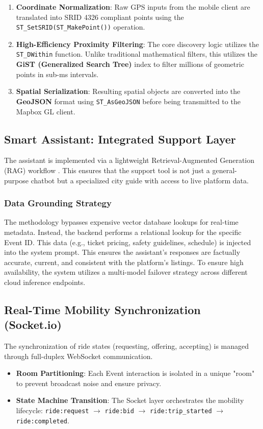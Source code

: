 \begin{enumerate}
    \item \textbf{Coordinate Normalization}: Raw GPS inputs from the mobile client are translated into SRID 4326 compliant points using the \texttt{ST\_SetSRID(ST\_MakePoint())} operation.
    \item \textbf{High-Efficiency Proximity Filtering}: The core discovery logic utilizes the \texttt{ST\_DWithin} function. Unlike traditional mathematical filters, this utilizes the \textbf{GiST (Generalized Search Tree)} index to filter millions of geometric points in sub-ms intervals.
    \item \textbf{Spatial Serialization}: Resulting spatial objects are converted into the \textbf{GeoJSON} format using \texttt{ST\_AsGeoJSON} before being transmitted to the Mapbox GL client.
\end{enumerate}

\subsection{Smart Assistant: Integrated Support Layer}
The assistant is implemented via a lightweight Retrieval-Augmented Generation (RAG) workflow \cite{llama3}. This ensures that the support tool is not just a general-purpose chatbot but a specialized city guide with access to live platform data.

\subsubsection{Data Grounding Strategy}
The methodology bypasses expensive vector database lookups for real-time metadata. Instead, the backend performs a relational lookup for the specific Event ID. This data (e.g., ticket pricing, safety guidelines, schedule) is injected into the system prompt. This ensures the assistant's responses are factually accurate, current, and consistent with the platform's listings. To ensure high availability, the system utilizes a multi-model failover strategy across different cloud inference endpoints.

\subsection{Real-Time Mobility Synchronization (Socket.io)}
The synchronization of ride states (requesting, offering, accepting) is managed through full-duplex WebSocket communication.
\begin{itemize}
    \item \textbf{Room Partitioning}: Each Event interaction is isolated in a unique "room" to prevent broadcast noise and ensure privacy.
    \item \textbf{State Machine Transition}: The Socket layer orchestrates the mobility lifecycle: \texttt{ride:request} $\rightarrow$ \texttt{ride:bid} $\rightarrow$ \texttt{ride:trip\_started} $\rightarrow$ \texttt{ride:completed}.
\end{itemize}

